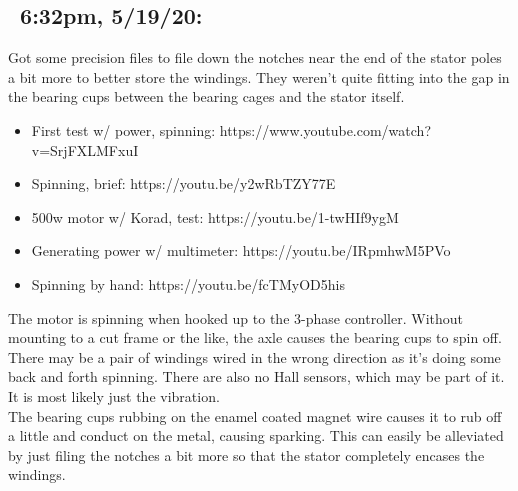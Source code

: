 \documentclass[11pt]{article} %
\begin{document}
\subsection*{~6:32pm, 5/19/20:} Got some precision files to file down the notches near the end of the stator poles a bit more to better store the windings. They weren’t quite fitting into the gap in the bearing cups between the bearing cages and the stator itself. \\

\begin{itemize}
\item First test w/ power, spinning: https://www.youtube.com/watch?v=SrjFXLMFxuI
\item Spinning, brief: https://youtu.be/y2wRbTZY77E
\item 500w motor w/ Korad, test: https://youtu.be/1-twHIf9ygM
\item Generating power w/ multimeter: https://youtu.be/IRpmhwM5PVo
\item Spinning by hand: https://youtu.be/fcTMyOD5his
\end{itemize}

The motor is spinning when hooked up to the 3-phase controller. Without mounting to a cut frame or the like, the axle causes the bearing cups to spin off. There may be a pair of windings wired in the wrong direction as it’s doing some back and forth spinning. There are also no Hall sensors, which may be part of it. It is most likely just the vibration. \\

The bearing cups rubbing on the enamel coated magnet wire causes it to rub off a little and conduct on the metal, causing sparking. This can easily be alleviated by just filing the notches a bit more so that the stator completely encases the windings. \\
\end{document}
